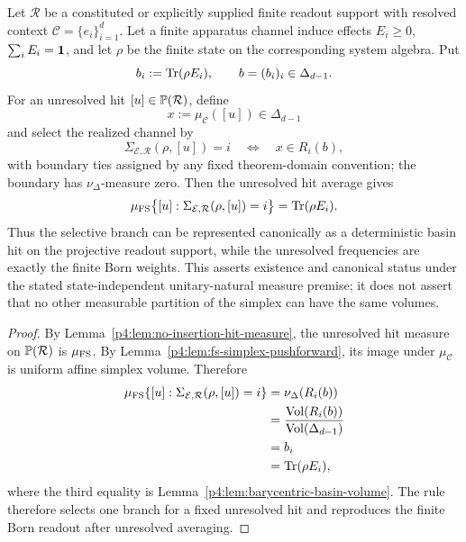 \documentclass[12pt,a4paper]{article}
\begin{document}
\begin{theorem}
\label{p4:thm:projective-readout-actualization}
Let \(\mathcal R\) be a constituted or explicitly supplied finite readout
support with resolved context
\(\mathcal C=\{e_i\}_{i=1}^d\).  Let a finite apparatus channel induce effects
\(E_i\ge0\), \(\sum_iE_i=\mathbf{1}\), and let \(\rho\) be the finite state on the
corresponding system algebra.  Put
\[
        b_i:=\operatorname{Tr}(\rho E_i),
        \qquad b=(b_i)_i\in\Delta_{d-1}.
\]
For an unresolved hit \([u]\in\mathbb{P}(\mathcal R)\), define
\[
        x:=\mu_{\mathcal C}([u])\in\Delta_{d-1}
\]
and select the realized channel by
\begin{equation}
\label{p4:eq:projective-actualization-selector}
        \Sigma_{\mathcal E,\mathcal R}(\rho,[u])=i
        \quad\Longleftrightarrow\quad
        x\in R_i(b),
\end{equation}
with boundary ties assigned by any fixed theorem-domain convention; the boundary has
\(\nu_\Delta\)-measure zero.  Then the unresolved hit average gives
\[
        \mu_{\rm FS}\bigl\{[u]:
        \Sigma_{\mathcal E,\mathcal R}(\rho,[u])=i\bigr\}
        =
        \operatorname{Tr}(\rho E_i).
\]
Thus the selective branch can be represented canonically as a deterministic basin
hit on the projective readout support, while the unresolved frequencies are exactly
the finite Born weights.  This asserts existence and canonical status under the stated state-independent
unitary-natural measure premise; it does not assert that no other measurable partition
of the simplex can have the same volumes.
\end{theorem}

\begin{proof}
By Lemma~\ref{p4:lem:no-insertion-hit-measure}, the unresolved hit measure on
\(\mathbb{P}(\mathcal R)\) is \(\mu_{\rm FS}\).  By
Lemma~\ref{p4:lem:fs-simplex-pushforward}, its image under \(\mu_{\mathcal C}\) is
uniform affine simplex volume.  Therefore
\[
\begin{aligned}
\mu_{\rm FS}\{[u]:\Sigma_{\mathcal E,\mathcal R}(\rho,[u])=i\}
&=
\nu_\Delta(R_i(b))\\
&=
\frac{\operatorname{Vol}(R_i(b))}{\operatorname{Vol}(\Delta_{d-1})}\\
&= b_i\\
&=\operatorname{Tr}(\rho E_i),
\end{aligned}
\]
where the third equality is Lemma~\ref{p4:lem:barycentric-basin-volume}.  The rule
therefore selects one branch for a fixed unresolved hit and reproduces the finite
Born readout after unresolved averaging.
\end{proof}
\end{document}
